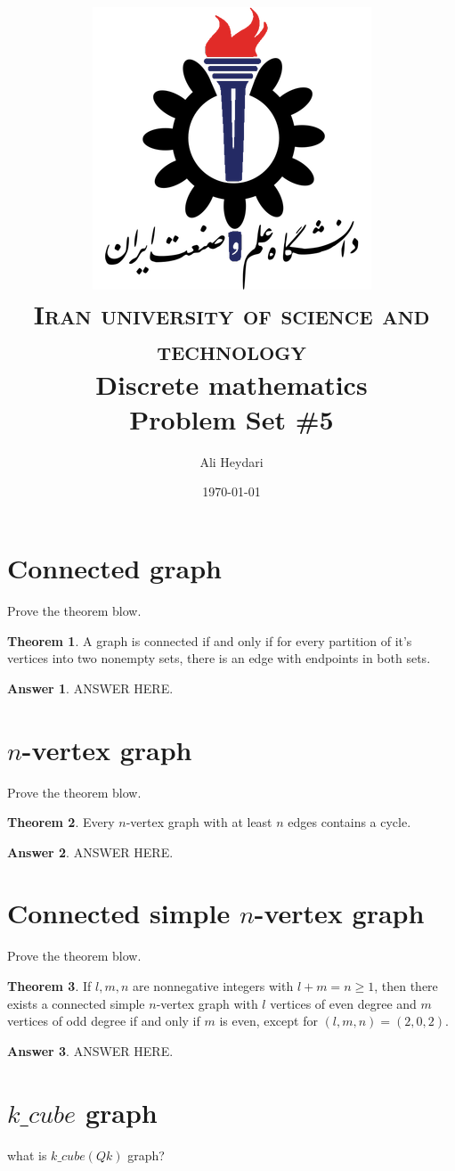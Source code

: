 \documentclass[a4paper]{article}
\title{
\textsc{
\center
\includegraphics[scale=0.5]{IUST_logo_color} \\
Iran university of science and technology} \\ [25pt] %
Discrete mathematics\\Problem Set \#5 \\
}
\author{Ali Heydari}
\date{\today}
\renewcommand{\(}{\left(}
\renewcommand{\)}{\right)}
\theoremstyle{plain}
\theoremstyle{plain}
\theoremstyle{definition}
\newtheorem*{answer}{Answer}
\newtheorem{theorem}{Theorem}[section]
\begin{document}
\maketitle

\section{Connected graph}
Prove the theorem blow.
\begin{theorem}
A graph is connected if and only if for every partition of it's vertices into two nonempty sets, there
is an edge with endpoints in both sets.
\end{theorem}
\begin{shaded}
\begin{answer}
ANSWER HERE.
\end{answer}
\end{shaded}

\section{$n$-vertex graph}
Prove the theorem blow.
\begin{theorem}
Every $n$-vertex graph with at least $n$ edges contains a cycle.
\end{theorem}
\begin{shaded}
\begin{answer}
ANSWER HERE.
\end{answer}
\end{shaded}
\section{Connected simple $n$-vertex graph}
Prove the theorem blow.
\begin{theorem}
If $l, m, n$ are nonnegative integers with $l + m = n \geq 1$, then there exists a connected simple $n$-vertex
graph with $l$ vertices of even degree and $m$ vertices of odd degree if and only if $m$ is even,
except for $(l, m, n) = (2, 0, 2)$.
\end{theorem}
\begin{shaded}
\begin{answer}
ANSWER HERE.
\end{answer}
\end{shaded}



\section{$k\_cube$ graph}
what is $k\_cube(Qk)$ graph?
\end{document}
